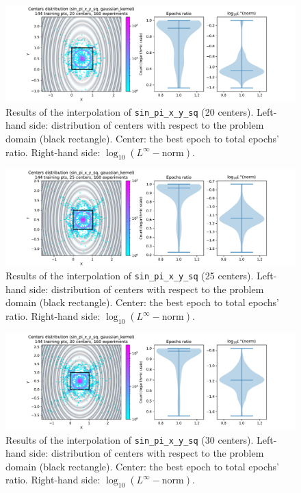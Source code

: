 \documentclass[12pt]{report} %
\begin{document}
\begin{figure}[H]
  \includegraphics[width=\textwidth, trim={2cm 0 2.8cm 0}, clip=true]{imagenes/experiments/2d/sin_pi_x_y_sq_interpolation/tr12_c20_sin_pi_x_y_sq_gaussian_kernel.pdf}
  \caption{Results of the interpolation of \texttt{sin\_pi\_x\_y\_sq} (20 centers).
    Left-hand side: distribution of centers with respect to the problem domain (black rectangle). Center: the best epoch to total epochs' ratio.
    Right-hand side: $\log_{10}(L^\infty-\text{norm})$.}
  \label{fig:sin-pi-x-y-sq-tr12-c20}
\end{figure}
\begin{figure}[H]
  \includegraphics[width=\textwidth, trim={2cm 0 2.8cm 0}, clip=true]{imagenes/experiments/2d/sin_pi_x_y_sq_interpolation/tr12_c25_sin_pi_x_y_sq_gaussian_kernel.pdf}
  \caption{Results of the interpolation of \texttt{sin\_pi\_x\_y\_sq} (25 centers).
    Left-hand side: distribution of centers with respect to the problem domain (black rectangle). Center: the best epoch to total epochs' ratio.
    Right-hand side: $\log_{10}(L^\infty-\text{norm})$.}
  \label{fig:sin-pi-x-y-sq-tr12-c25}
\end{figure}
\begin{figure}[H]
  \includegraphics[width=\textwidth, trim={2cm 0 2.8cm 0}, clip=true]{imagenes/experiments/2d/sin_pi_x_y_sq_interpolation/tr12_c30_sin_pi_x_y_sq_gaussian_kernel.pdf}
  \caption{Results of the interpolation of \texttt{sin\_pi\_x\_y\_sq} (30 centers).
    Left-hand side: distribution of centers with respect to the problem domain (black rectangle). Center: the best epoch to total epochs' ratio.
    Right-hand side: $\log_{10}(L^\infty-\text{norm})$.}
  \label{fig:sin-pi-x-y-sq-tr12-c30}
\end{figure}
\end{document}

